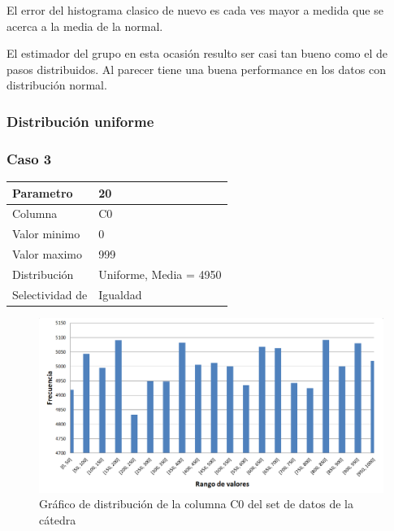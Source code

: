		El error del histograma clasico de nuevo es cada ves mayor a medida que se acerca a la media de la normal. 
		
		El estimador del grupo en esta ocasi\'on resulto ser casi tan bueno como el de pasos distribuidos. Al parecer tiene una buena performance en los datos con distribuci\'on normal.

	\subsubsection{Distribuci\'on uniforme}	

	\quad

\subsubsection*{Caso 3}

	\quad
		
		\begin{tabular}{| l | l |}
		\hline
		Parametro & 20 \\
		\hline
		Columna & C0 \\
		\hline
		Valor minimo & 0 \\
		\hline
		Valor maximo & 999 \\
		\hline
		Distribuci\'on & Uniforme, Media = 4950 \\
		\hline
		Selectividad de & Igualdad \\
		\hline
		\end{tabular}		
		
		\quad
		
		\quad	
						
	\begin{figure}[H]
	  \begin{center}
	    \includegraphics[scale=.50]{imagenes/distro_C0.png}
	    \caption{Gr\'afico de distribuci\'on de la columna C0 del set de datos de la c\'atedra} 
	    \label{fig:(distro_C0}
	  \end{center}
	\end{figure}

